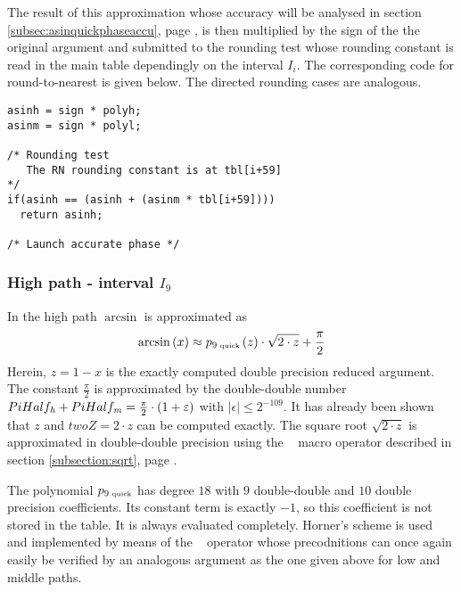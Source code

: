 The result of this approximation whose accuracy will be analysed in
section \ref{subsec:asinquickphaseaccu}, page
\pageref{subsec:asinquickphaseaccu}, is then multiplied by the sign of
the the original argument and submitted to the rounding test whose
rounding constant is read in the main table dependingly on the
interval $I_i$. The corresponding code for round-to-nearest is given
below. The directed rounding cases are analogous.
\begin{lstlisting}[caption={Middle path quick phase rounding test},firstnumber=1]
asinh = sign * polyh;
asinm = sign * polyl;

/* Rounding test 
   The RN rounding constant is at tbl[i+59]
*/
if(asinh == (asinh + (asinm * tbl[i+59]))) 
  return asinh;

/* Launch accurate phase */
\end{lstlisting} 

\subsubsection{High path - interval $I_9$}
In the high path $\arcsin$ is approximated as 
$$\arcsin\left( x \right) \approx p_{9\mbox{\tiny ~quick}}\left( z \right) \cdot \sqrt{2 \cdot z} + \frac{\pi}{2}$$
Herein, $z = 1 - x$ is the exactly computed double precision reduced
argument. The constant $\frac{\pi}{2}$ is approximated by the
double-double number $PiHalf_{\mathit{h}} + PiHalf_{\mathit{m}} = \frac{\pi}{2} \cdot
\left( 1 + \varepsilon \right)$ with $\left \vert \epsilon \right \vert
\leq 2^{-109}$. It has already been shown that $z$ and $twoZ = 2 \cdot
z$ can be computed exactly. The square root $\sqrt{2 \cdot z}$ is
approximated in double-double precision using the \SqrtD~ macro
operator described in section \ref{subsection:sqrt}, page
\pageref{subsection:sqrt}. 

The polynomial $p_{9\mbox{\tiny ~quick}}$ has degree $18$ with $9$
double-double and $10$ double precision coefficients. Its constant
term is exactly $-1$, so this coefficient is not stored in the table.
It is always evaluated completely. Horner's scheme is used and
implemented by means of the \MulAddDdD~ operator whose precodnitions
can once again easily be verified by an analogous argument as the one
given above for low and middle paths. 

